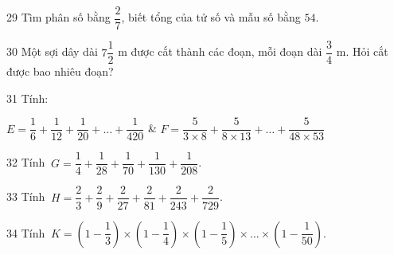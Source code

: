 \gap
\begin{probbox}{29}{\relax}
Tìm phân số bằng $\dfrac27$, biết tổng của tử số và mẫu số bằng $54$.
\end{probbox}
\gap
\begin{probbox}{30}{\relax}
Một sợi dây dài $7\dfrac12$ m được cắt thành các đoạn, mỗi đoạn dài $\dfrac34$ m. Hỏi cắt được bao nhiêu đoạn?
\end{probbox}
\begin{probbox}{31}{}
Tính:
\begin{cols2}
$E=\dfrac16+\dfrac1{12}+\dfrac1{20}+\dots+\dfrac1{420}$ & $F=\dfrac5{3\times8}+\dfrac5{8\times13}+\dots+\dfrac5{48\times53}$
\end{cols2}
\end{probbox}
\gap
\begin{probbox}{32}{}
Tính $\ G=\dfrac14+\dfrac1{28}+\dfrac1{70}+\dfrac1{130}+\dfrac1{208}$.
\end{probbox}
\gap
\begin{probbox}{33}{}
Tính $\ H=\dfrac23+\dfrac29+\dfrac2{27}+\dfrac2{81}+\dfrac2{243}+\dfrac2{729}$.
\end{probbox}
\gap
\begin{probbox}{34}{}
Tính $\ K=\left(1-\dfrac13\right)\times\left(1-\dfrac14\right)\times\left(1-\dfrac15\right)\times\dots\times\left(1-\dfrac1{50}\right)$.
\end{probbox}
